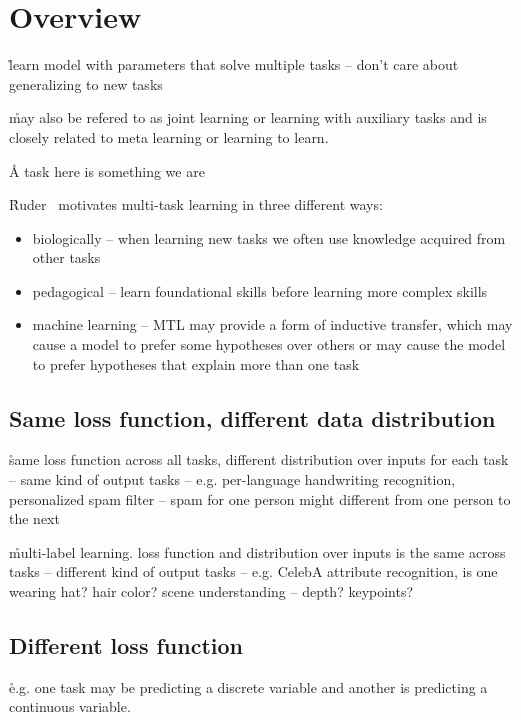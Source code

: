 \section{Overview}


\r{learn model with parameters that solve multiple tasks -- don't care about generalizing to new tasks}

\r{may also be refered to as joint learning or learning with auxiliary tasks and is closely related to meta learning  or learning to learn.}

\r{A task here is something we are }

\r{Ruder~\cite{DBLP:journals/corr/Ruder17a} motivates multi-task learning in three different ways:}

\begin{itemize}[noitemsep,topsep=0pt]
	\item biologically -- when learning new tasks we often use knowledge acquired from other tasks
	\item pedagogical -- learn foundational skills before learning more complex skills
	\item machine learning -- MTL may provide a form of inductive transfer, which may cause a model to prefer some hypotheses over others or may cause the model to prefer hypotheses that explain more than one task
\end{itemize}


\subsection{Same loss function, different data distribution}

\r{same loss function across all tasks, different distribution over inputs for each task -- same kind of output tasks -- e.g. per-language handwriting recognition, personalized spam filter -- spam for one person might different from one person to the next}

\r{multi-label learning. loss function and distribution over inputs is the same across tasks -- different kind of output tasks -- e.g. CelebA attribute recognition, is one wearing hat? hair color? scene understanding -- depth? keypoints?}

\subsection{Different loss function}

\r{e.g. one task may be predicting a discrete variable and another is predicting a continuous variable.}

